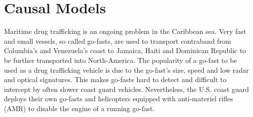 \documentclass[conference]{IEEEtran}
\begin{document}







\section{Causal Models}


Maritime drug trafficking is an ongoing problem in the Caribbean sea. Very fast and small vessels, so called go-fasts, are used to transport contraband from Columbia's and Venezuela's coast to Jamaica, Haiti and Dominican Republic to be further transported into North-America. The popularity of a go-fast to be used as a drug trafficking vehicle is due to the go-fast's size, speed and low radar and optical signatures. This makes go-fasts hard to detect and difficult to intercept by often slower coast guard vehicles. Nevertheless, the U.S. coast guard deploys their own go-fasts and helicopters equipped with anti-materiel rifles (AMR) to disable the engine of a running go-fast. 
\end{document}
